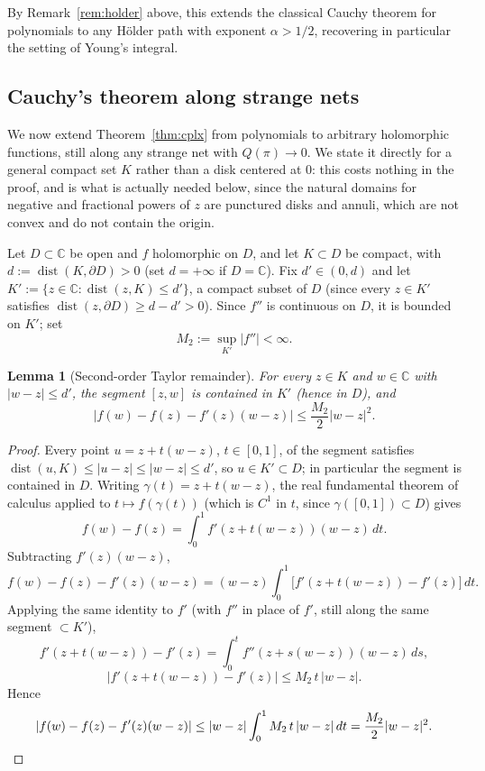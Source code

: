 \documentclass[11pt,fleqn]{article}
\def\C{\mathbb C}
\theoremstyle{plain}
\newtheorem{lemma}[thm]{Lemma}
\theoremstyle{remark}
\begin{document}
By Remark~\ref{rem:holder} above, this extends the classical Cauchy
theorem for polynomials to any H\"older path with exponent $\alpha>1/2$,
recovering in particular the setting of Young's integral.

\subsection{Cauchy's theorem along strange nets}\label{sec:tags-convention}

We now extend Theorem~\ref{thm:cplx} from polynomials to arbitrary
holomorphic functions, still along any strange net with $Q(\pi)\to0$. We
state it directly for a general compact set $K$ rather than a disk
centered at $0$: this costs nothing in the proof, and is what is actually
needed below, since the natural domains for negative and fractional
powers of $z$ are punctured disks and annuli, which are not convex and do
not contain the origin.

Let $D\subset\C$ be open and $f$ holomorphic on $D$, and let $K\subset D$
be compact, with $d:=\operatorname{dist}(K,\partial D)>0$ (set $d=+\infty$
if $D=\C$). Fix $d'\in(0,d)$ and let
$K':=\{z\in\C:\operatorname{dist}(z,K)\le d'\}$, a compact subset of $D$
(since every $z\in K'$ satisfies $\operatorname{dist}(z,\partial D)\ge
d-d'>0$). Since $f''$ is continuous on $D$, it is bounded on $K'$; set
\[
M_2:=\sup_{K'}|f''|<\infty.
\]

\begin{lemma}[Second-order Taylor remainder]\label{lem:taylor2}
For every $z\in K$ and $w\in\C$ with $|w-z|\le d'$, the segment $[z,w]$ is
contained in $K'$ (hence in $D$), and
\[
\big|f(w)-f(z)-f'(z)(w-z)\big|\le\frac{M_2}2|w-z|^2.
\]
\end{lemma}
\begin{proof}
Every point $u=z+t(w-z)$, $t\in[0,1]$, of the segment satisfies
$\operatorname{dist}(u,K)\le|u-z|\le|w-z|\le d'$, so $u\in K'\subset D$;
in particular the segment is contained in $D$. Writing
$\gamma(t)=z+t(w-z)$, the real fundamental theorem of calculus applied to
$t\mapsto f(\gamma(t))$ (which is $C^1$ in $t$, since $\gamma([0,1])\subset D$) gives
\[
f(w)-f(z)=\int_0^1f'(z+t(w-z))(w-z)\,dt.
\]
Subtracting $f'(z)(w-z)$,
\[
f(w)-f(z)-f'(z)(w-z)=(w-z)\int_0^1\big[f'(z+t(w-z))-f'(z)\big]\,dt.
\]
Applying the same identity to $f'$ (with $f''$ in place of $f'$, still
along the same segment $\subset K'$),
\[
f'(z+t(w-z))-f'(z)=\int_0^tf''(z+s(w-z))(w-z)\,ds,
\]
\[
|f'(z+t(w-z))-f'(z)|\le M_2\,t\,|w-z|.
\]
Hence
\[
|f(w)-f(z)-f'(z)(w-z)|\le|w-z|\int_0^1M_2\,t\,|w-z|\,dt=\frac{M_2}2|w-z|^2.
\qedhere
\]
\end{proof}
\end{document}
